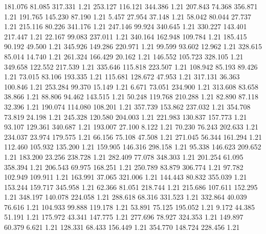  181.076   81.085  317.331         1.21
 253.127  116.121  344.386         1.21
 207.843   74.368  356.871         1.21
 191.765  145.230   87.190         1.21
   5.457   27.954   37.148         1.21
  58.042   80.044   27.737         1.21
 215.116   80.226  341.176         1.21
 247.146   99.924  340.645         1.21
 330.227  143.401  217.447         1.21
  22.167   99.083  237.011         1.21
 340.164  162.948  109.784         1.21
 185.415   90.192   49.500         1.21
 345.926  149.286  220.971         1.21
  99.599   93.602   12.962         1.21
 328.615   85.014   14.740         1.21
 261.324  166.429   20.162         1.21
 146.552  105.723  328.105         1.21
 349.658  122.552  217.539         1.21
 335.646  115.818  223.507         1.21
 108.942   85.193   89.426         1.21
  73.015   83.106  193.335         1.21
 115.681  128.672   47.953         1.21
 317.131   36.363  100.846         1.21
 253.284   99.370   15.149         1.21
   6.671   73.051  234.900         1.21
 313.608   83.658   38.866         1.21
  88.806   94.462  143.515         1.21
  50.248  119.768  210.288         1.21
  82.890   87.118   32.396         1.21
 190.074  114.080  108.201         1.21
 357.739  153.862  237.032         1.21
 354.708   73.819   24.198         1.21
 245.328  120.580  204.003         1.21
 221.983  130.837  157.773         1.21
  93.107  129.361  340.687         1.21
 193.007   27.100    8.122         1.21
  70.230   76.243  202.633         1.21
 234.037   23.974  179.575         1.21
  66.156   75.108   47.508         1.21
 271.045   56.344  161.294         1.21
 112.460  105.932  135.200         1.21
 159.905  146.316  298.158         1.21
  95.338  146.623  209.652         1.21
 183.200   23.256  238.728         1.21
 282.409   77.078  348.303         1.21
 201.254   61.095  358.394         1.21
 206.543   69.975  168.251         1.21
 250.789   83.879  306.774         1.21
  97.782  102.949  109.911         1.21
 163.991   37.065  321.006         1.21
 144.443   80.832  355.039         1.21
 153.244  159.717  345.958         1.21
  62.366   81.051  218.744         1.21
 215.686  107.611  152.295         1.21
 348.197  140.078  224.058         1.21
 288.618   68.316  331.523         1.21
 332.864   40.039   76.616         1.21
 104.933   99.888  119.178         1.21
  53.891   75.125  195.052         1.21
   9.172   44.385   51.191         1.21
 175.972   43.341  147.775         1.21
 277.696   78.927  324.353         1.21
 149.897   60.379    6.621         1.21
 128.331   68.433  156.449         1.21
 354.770  148.724  228.456         1.21
